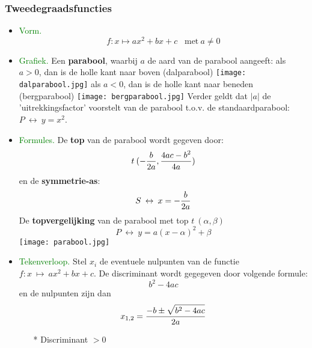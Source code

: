 \subsubsection{Tweedegraadsfuncties} \label{tweedegraadsfuncties}
		\begin{itemize}%
		\item \textcolor{green}{Vorm.}
		\[f: x\mapsto ax^2+bx+c \;\;\;\mbox{met}\: a\neq 0\]
		\item \textcolor{green}{Grafiek.}\newline
		Een \hypertarget{parabool}{{\bf parabool}}, waarbij $a$ de aard van de parabool aangeeft:\label{parabool}\newline
		als $a>0$, dan is de holle kant naar boven (dalparabool)\newline 
                \texttt{[image: dalparabool.jpg]}
		als $a<0$, dan is de holle kant naar beneden (bergparabool)\newline
                \texttt{[image: bergparabool.jpg]}
		Verder geldt dat $|a|$ de 'uitrekkingsfactor' voorstelt van de parabool t.o.v. de 		standaardparabool: $P\:\leftrightarrow\: y=x^2$.
		\item \textcolor{green}{Formules.}\newline
		De \hypertarget{topvergelijking}{{\bf top} van de parabool} wordt gegeven door:\label{topvergelijking}
		\[t\:(-\displaystyle\frac{\displaystyle b}{\displaystyle 2a},\displaystyle\frac{\displaystyle 4ac-b^2}{\displaystyle 4a}) \]
		en de {\bf symmetrie-as}:
		\[S\:\leftrightarrow\:x=-\displaystyle\frac{\displaystyle b}{\displaystyle 2a}\]
		De {\bf topvergelijking} van de parabool met top $t\:(\alpha, \beta)$
		\[P\:\leftrightarrow\: y=a(x-\alpha)^2+\beta\]
                \texttt{[image: parabool.jpg]}
		\item \textcolor{green}{Tekenverloop.}\newline
		Stel $x_i$ de eventuele nulpunten van de functie $f:x\:\mapsto \:ax^2+bx+c$. 
		De discriminant wordt gegegeven door volgende formule: 
		\[b^2-4ac\]
		en de nulpunten zijn dan
		\[x_{1, 2}=\displaystyle\frac{\displaystyle -b\pm\sqrt{b^2-4ac}}{\displaystyle 2a}\]
		\begin{itemize}%
		\item[*] Discriminant  $>0$\vskip 0.5cm
		\begin{tabular}{c|ccccccc}

\end{tabular}
\end{itemize}
\end{itemize}
